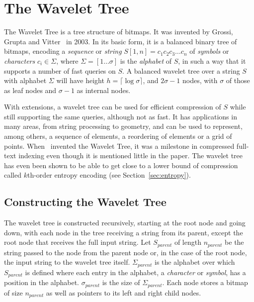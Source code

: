 \section{The Wavelet Tree}
The Wavelet Tree is a tree structure of bitmaps.
It was invented by Grossi, Grupta and Vitter~ in 2003.
In its basic form, it is a balanced binary tree of bitmaps, encoding a \textit{sequence} or \textit{string} $S[1,n] = c_1c_2c_3 \ldots c_n$ of \textit{symbols} or \textit{characters} $c_i \in \Sigma$, where $\Sigma = [1 \ldots \sigma]$ is the \textit{alphabet} of $S$, in such a way that it supports a number of fast queries on $S$.
A balanced wavelet tree over a string $S$ with alphabet $\Sigma$ will have height $h = \lceil \log \sigma \rceil$, and $2 \sigma - 1$ nodes, with $\sigma$ of those as leaf nodes and $\sigma - 1$ as internal nodes.

With extensions, a wavelet tree can be used for efficient compression of $S$ while still supporting the same queries, although not as fast.
It has applications in many areas, from string processing to geometry, and can be used to represent, among others, a sequence of elements, a reordering of elements or a grid of points. 
When~ invented the Wavelet Tree, it was a milestone in compressed full-text indexing even though it is mentioned little in the paper.
The wavelet tree has even been shown to be able to get close to a lower bound of compression called $k$th-order entropy encoding (see Section~\ref{sec:entropy}).

\subsection{Constructing the Wavelet Tree}
\label{sec:nodeconstruction}
The wavelet tree is constructed recursively, starting at the root node and going down, with each node in the tree receiving a string from its parent, except the root node that receives the full input string.
Let $S_{\mathit{parent}}$ of length $n_{\mathit{parent}}$ be the string passed to the node from the parent node or, in the case of the root node, the input string to the wavelet tree itself.
$\Sigma_{\mathit{parent}}$ is the alphabet over which $S_{\mathit{parent}}$ is defined where each entry in the alphabet, a \textit{character} or \textit{symbol}, has a position in the alphabet.
$\sigma_{\mathit{parent}}$ is the size of $\Sigma_{\mathit{parent}}$.
Each node stores a bitmap of size $n_{\mathit{parent}}$ as well as pointers to its left and right child nodes.

